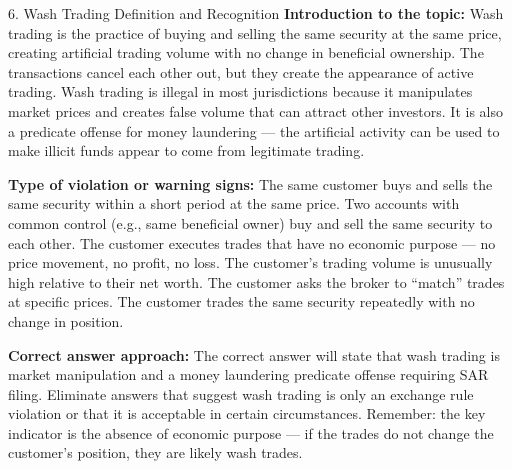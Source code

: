 \documentclass[11pt,a4paper]{beamer}
\begin{document}
\begin{frame}{6. Wash Trading Definition and Recognition}
\tiny
\noindent\textbf{Introduction to the topic:} Wash trading is the practice of buying and selling the same security at the same price, creating artificial trading volume with no change in beneficial ownership. The transactions cancel each other out, but they create the appearance of active trading. Wash trading is illegal in most jurisdictions because it manipulates market prices and creates false volume that can attract other investors. It is also a predicate offense for money laundering — the artificial activity can be used to make illicit funds appear to come from legitimate trading.

\vspace{0.1cm}
\noindent\textbf{Type of violation or warning signs:} The same customer buys and sells the same security within a short period at the same price. Two accounts with common control (e.g., same beneficial owner) buy and sell the same security to each other. The customer executes trades that have no economic purpose — no price movement, no profit, no loss. The customer's trading volume is unusually high relative to their net worth. The customer asks the broker to “match” trades at specific prices. The customer trades the same security repeatedly with no change in position.

\vspace{0.1cm}
\noindent\textbf{Correct answer approach:} The correct answer will state that wash trading is market manipulation and a money laundering predicate offense requiring SAR filing. Eliminate answers that suggest wash trading is only an exchange rule violation or that it is acceptable in certain circumstances. Remember: the key indicator is the absence of economic purpose — if the trades do not change the customer's position, they are likely wash trades.
\end{frame}
\end{document}
